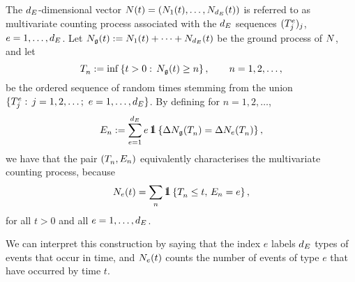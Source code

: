 \documentclass[10pt]{article}
\begin{document}
The $\numEventTypes$-dimensional vector $\multiCountingProc(t) = (\countingProc[1](t), \dots , \countingProc[\numEventTypes](t))$ is referred to as multivariate counting process associated with the $\numEventTypes$ sequences $(\arrivalTimes_{j})_j$, $e=1,\dots, \numEventTypes$. Let $\groundProc(t) := \countingProc[1](t)+ \dots + \countingProc[\numEventTypes](t)$ be the ground process of $\multiCountingProc$, and let 
\begin{equation*}
 \arrivalTimes[ ]_{n} := \inf \left\lbrace t>0: \, \groundProc(t) \geq n\right\rbrace, \qquad n=1,2,\dots, 
\end{equation*}
be the ordered sequence of random times stemming from the union $\lbrace \arrivalTimes_{j}: \, j=1,2,\dots; \,\, e=1,\dots,\numEventTypes\rbrace$. By defining for $n=1,2, \dots$, 
\begin{equation*}
 \event := \sum_{e=1}^{\numEventTypes} e \, \one\left\lbrace \Delta \groundProc(\arrivalTimes[ ]_{n}) = \Delta\countingProc(\arrivalTimes[ ]_{n}) \right\rbrace,
\end{equation*}
we have that the pair $(\arrivalTimes[ ]_{n}, \event[n])$ equivalently characterises the multivariate counting process, because 
\begin{equation}\label{eq.NTE_counting_proc}
 \countingProc(t) = \sum_{n} \one \left\lbrace \arrivalTimes[ ]_{n}\leq t, \, \event[n] = e\right\rbrace,
\end{equation}
for all $t>0$ and all $e=1,\dots, \numEventTypes$.

We can interpret this construction by saying that the index $e$ labels $\numEventTypes$ types of events that occur in time, and $\countingProc(t)$ counts the number of events of type $e$ that have occurred by time $t$. 
\end{document}
